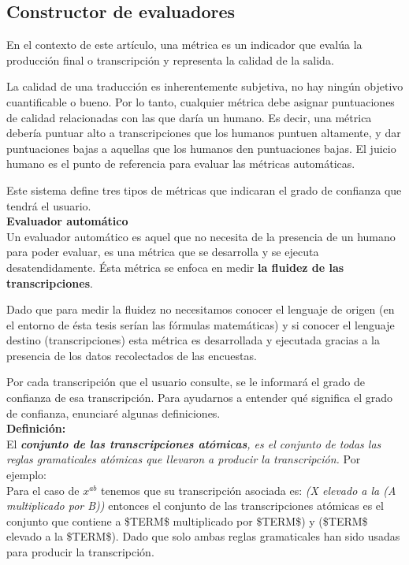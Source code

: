 \subsection{Constructor de evaluadores}

En el contexto de este artículo, una métrica es un indicador que evalúa la producción final o transcripción y representa la calidad de la salida.

La calidad de una traducción es inherentemente subjetiva, no hay ningún objetivo cuantificable o bueno. Por lo tanto, cualquier métrica debe asignar puntuaciones de calidad relacionadas con las que daría un humano. Es decir, una métrica debería puntuar alto a transcripciones que los humanos puntuen altamente, y dar puntuaciones bajas a aquellas que los humanos den puntuaciones bajas. El juicio humano es el punto de referencia para evaluar las métricas automáticas.

Este sistema define tres tipos de métricas que indicaran el grado de confianza que tendrá el usuario.\\

{\Large \textbf{Evaluador automático}}\\

Un evaluador automático es aquel que no necesita de la presencia de un humano para poder evaluar, es una métrica que se desarrolla y se ejecuta desatendidamente. Ésta métrica se enfoca en medir \textbf{la fluidez de las transcripciones}.

Dado que para medir la fluidez no necesitamos conocer el lenguaje de origen (en el entorno de ésta tesis serían las fórmulas matemáticas) y si conocer el lenguaje destino (transcripciones) esta métrica es desarrollada y ejecutada gracias a la presencia de los datos recolectados de las encuestas.

Por cada transcripción que el usuario consulte, se le informará el grado de confianza de esa transcripción. Para ayudarnos a entender qué significa el grado de confianza, enunciaré algunas definiciones.\\

\textbf{Definición:}\\El \textit{\textbf{conjunto de las transcripciones atómicas}, es el conjunto de todas las reglas gramaticales atómicas que llevaron a producir la transcripción.}
Por ejemplo:\\
Para el caso de $x^{ab}$ tenemos que su transcripción asociada es: \textit{(X elevado a la (A multiplicado por B))} entonces el conjunto de las transcripciones atómicas es el conjunto que contiene a \$TERM\$ multiplicado por \$TERM\$) y (\$TERM\$ elevado a la \$TERM\$). Dado que solo ambas reglas gramaticales han sido usadas para producir la transcripción.\\

